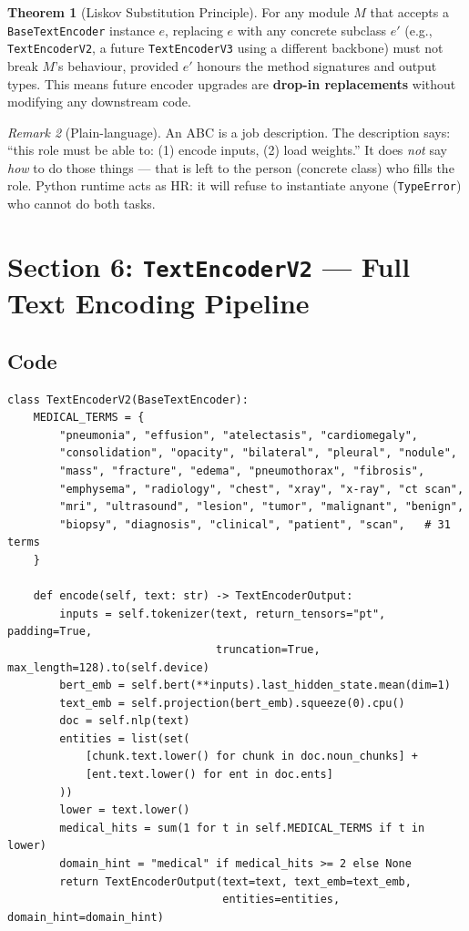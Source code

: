 \documentclass[12pt,a4paper]{article}
\theoremstyle{definition}
\newtheorem{theorem}{Theorem}[section]
\theoremstyle{remark}
\newtheorem{remark}[theorem]{Remark}
\begin{document}
\begin{theorem}[Liskov Substitution Principle]
For any module $M$ that accepts a \texttt{BaseTextEncoder} instance $e$,
replacing $e$ with any concrete subclass $e'$ (e.g., \texttt{TextEncoderV2},
a future \texttt{TextEncoderV3} using a different backbone) must not break
$M$'s behaviour, provided $e'$ honours the method signatures and output types.
This means future encoder upgrades are \textbf{drop-in replacements} without
modifying any downstream code.
\end{theorem}

\begin{remark}[Plain-language]
An ABC is a job description.
The description says: ``this role must be able to: (1) encode inputs,
(2) load weights.'' It does \emph{not} say \emph{how} to do those things —
that is left to the person (concrete class) who fills the role.
Python runtime acts as HR: it will refuse to instantiate anyone
(\texttt{TypeError}) who cannot do both tasks.
\end{remark}

\section{Section 6: \texttt{TextEncoderV2} — Full Text Encoding Pipeline}

\subsection{Code}

\begin{lstlisting}[caption={\texttt{TextEncoderV2} class}]
class TextEncoderV2(BaseTextEncoder):
    MEDICAL_TERMS = {
        "pneumonia", "effusion", "atelectasis", "cardiomegaly",
        "consolidation", "opacity", "bilateral", "pleural", "nodule",
        "mass", "fracture", "edema", "pneumothorax", "fibrosis",
        "emphysema", "radiology", "chest", "xray", "x-ray", "ct scan",
        "mri", "ultrasound", "lesion", "tumor", "malignant", "benign",
        "biopsy", "diagnosis", "clinical", "patient", "scan",   # 31 terms
    }

    def encode(self, text: str) -> TextEncoderOutput:
        inputs = self.tokenizer(text, return_tensors="pt", padding=True,
                                truncation=True, max_length=128).to(self.device)
        bert_emb = self.bert(**inputs).last_hidden_state.mean(dim=1)
        text_emb = self.projection(bert_emb).squeeze(0).cpu()
        doc = self.nlp(text)
        entities = list(set(
            [chunk.text.lower() for chunk in doc.noun_chunks] +
            [ent.text.lower() for ent in doc.ents]
        ))
        lower = text.lower()
        medical_hits = sum(1 for t in self.MEDICAL_TERMS if t in lower)
        domain_hint = "medical" if medical_hits >= 2 else None
        return TextEncoderOutput(text=text, text_emb=text_emb,
                                 entities=entities, domain_hint=domain_hint)
\end{lstlisting}
\end{document}
